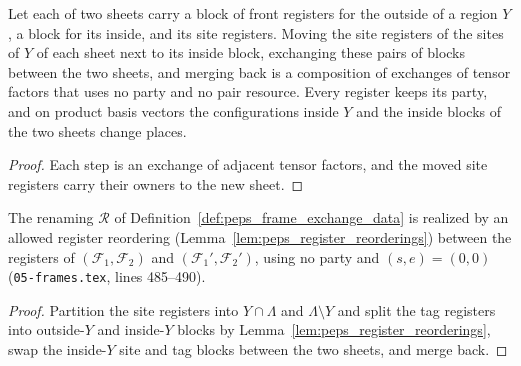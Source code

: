 \begin{lemma}
    \label{lem:lattice_block_renaming_word}
    \leanok
    Let each of two sheets carry a block of front registers for the outside of a
    region $Y$, a block for its inside, and its site registers. Moving the site
    registers of the sites of $Y$ of each sheet next to its inside block,
    exchanging these pairs of blocks between the two sheets, and merging back is a
    composition of exchanges of tensor factors that uses no party and no pair
    resource. Every register keeps its party, and on product basis vectors the
    configurations inside $Y$ and the inside blocks of the two sheets change
    places.
\end{lemma}

\begin{proof}\leanok
    Each step is an exchange of adjacent tensor factors, and the moved site
    registers carry their owners to the new sheet.
\end{proof}

\begin{lemma}
    \label{lem:peps_exchange_renaming_word}
    \leanok
    The renaming $\mathcal R$ of Definition~\ref{def:peps_frame_exchange_data}
    is realized by an allowed register reordering (Lemma~\ref{lem:peps_register_reorderings})
    between the registers of $(\mathcal F_1,\mathcal F_2)$ and
    $(\mathcal F_1',\mathcal F_2')$, using no party and $(s,e)=(0,0)$
    (\texttt{05-frames.tex}, lines 485--490).
\end{lemma}

\begin{proof}\leanok
    Partition the site registers into $Y\cap\Lambda$ and $\Lambda\setminus Y$
    and split the tag registers into outside-$Y$ and inside-$Y$ blocks by
    Lemma~\ref{lem:peps_register_reorderings}, swap the inside-$Y$ site and tag
    blocks between the two sheets, and merge back.
\end{proof}

